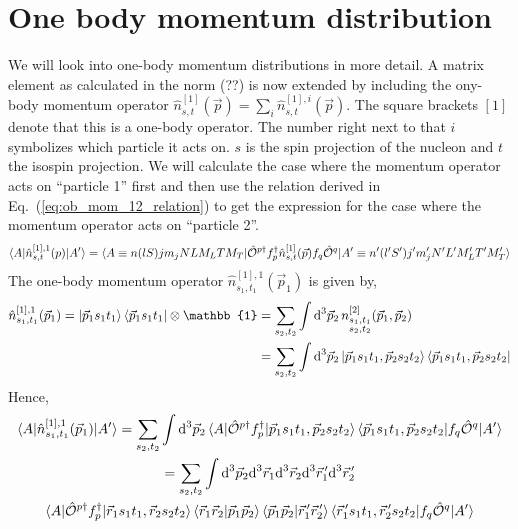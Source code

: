 \documentclass[10pt]{article}
\begin{document}
\section{One body momentum distribution}
\label{sec:ob_mom_distr_derivation}
We will look into one-body momentum distributions in more detail. A matrix element as calculated in the norm (??) is now extended by including the ony-body momentum operator $ \hat{n}_{s,t}^{[1]}(\vec{p}) = \sum_{i} \hat{n}_{s,t}^{[1],i}(\vec{p})$. The square brackets $[1]$ denote that this is a one-body operator. The number right next to that $i$ symbolizes which particle it acts on. $s$ is the spin projection of the nucleon and $t$ the isospin projection. We will calculate the case where the momentum operator acts on ``particle 1'' first and then use the relation derived in Eq.~(\ref{eq:ob_mom_12_relation}) to get the expression for the case where the momentum operator acts on ``particle 2''.
\begin{align*}
	\braket{A | \hat{n}_{s,t}^{[1],1}(p) | A'} = \braket { A \equiv n (l S) j m_j N L M_L T M_T | \hat{\mathcal{O}}^{p\dagger} f_{p}^{\dagger} \hat{n}_{s,t}^{[1]}(\vec{p}) f_{q} \hat{ \mathcal{O}}^{q} | A' \equiv n' (l' S') j' m_j' N' L' M_L' T' M_T' }
\end{align*}
The one-body momentum operator $\hat{n}_{s_1,t_1}^{[1],1}(\vec{p}_1)$ is given by,
\begin{align*}
	\hat{n}_{s_1,t_1}^{[1],1}(\vec{p}_1) = \ket{\vec{p}_1 s_1 t_1} \bra{\vec{p}_1 s_1 t_1} \otimes \mathbb{1} &= \sum_{s_2,t_2} \int \text{d}^{3} \vec{p}_{2} \, n_{ \substack{ s_1,t_1 \\ s_2,t_2} }^{[2]}(\vec{p}_1,\vec{p}_2)\\
	& = \sum_{s_2,t_2} \int \text{d}^{3} \vec{p}_{2} \ket{ \vec{p}_1 s_1 t_1, \vec{p}_2 s_2 t_2 } \bra { \vec{p}_1 s_1 t_1, \vec{p}_2 s_2 t_2}
\end{align*}
Hence,
\begin{multline*}
	\braket{ A | \hat{n}_{s_1,t_1}^{[1],1}(\vec{p}_1) | A'} = \sum_{s_2,t_2} \int \text{d}^{3} \vec{p}_{2} \braket{ A | \hat{\mathcal{O}}^{p\dagger} f_{p}^{\dagger} | \vec{p}_1 s_1 t_1, \vec{p}_2 s_2 t_2 } \braket{ \vec{p}_1 s_1 t_1, \vec{p}_2 s_2 t_2 | f_{q} \hat{ \mathcal{O}}^{q} | A'} \\
	=  \sum_{s_2,t_2} \int \text{d}^{3} \vec{p}_{2} \text{d}^{3} \vec{r}_{1} \text{d}^{3} \vec{r}_{2} \text{d}^{3} \vec{r}_{1}^{\, \prime} \text{d}^{3} \vec{r}_{2}^{\, \prime} \\
	 \braket{ A | \hat{\mathcal{O}}^{p\dagger} f_{p}^{\dagger} | \vec{r}_{1} s_1 t_1, \vec{r}_{2} s_2 t_2 } \braket{ \vec{r}_1 \vec{r}_2 | \vec{p}_1 \vec{p}_2 } \braket{ \vec{p}_1 \vec{p}_2 | \vec{r}_{1}^{\, \prime} \vec{r}_{2}^{\, \prime} } \braket{ \vec{r}_{1}^{\, \prime} s_1 t_1 , \vec{r}_{2}^{\, \prime} s_2 t_2 | f_{q} \hat{ \mathcal{O}}^{q} | A'}
\end{multline*}
\end{document}
